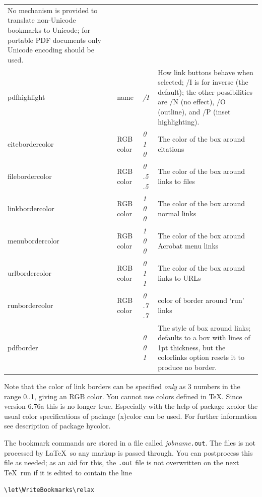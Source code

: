\documentclass[pdftex]{article}
\begin{document}
\begin{longtable}{@{}>{\ttfamily}ll>{\itshape}lp{7.5cm}@{}}
    No mechanism is provided to translate non-Unicode bookmarks to
    Unicode; for portable PDF documents only Unicode encoding should
    be used.\\
pdfhighlight       & name      & /I      & How link buttons behave when selected; /I is for inverse (the default);
                                           the other possibilities are /N (no effect), /O (outline), and /P (inset
                                           highlighting). \\
citebordercolor    & RGB color & 0 1 0   & The color of the box around citations \\
filebordercolor    & RGB color & 0 .5 .5 & The color of the box around links to files \\
linkbordercolor    & RGB color & 1 0 0   & The color of the box around normal links \\
menubordercolor    & RGB color & 1 0 0   & The color of the box around Acrobat menu links \\
urlbordercolor     & RGB color & 0 1 1   & The color of the box around links to URLs \\
runbordercolor     & RGB color & 0 .7 .7 & color of border around `run' links \\
pdfborder          &           & 0 0 1   & The style of box around links; defaults to a box with lines of 1pt thickness,
                                           but the colorlinks option resets it to produce no border.
\end{longtable}

Note that the color of link borders can be specified \emph{only} as 3
numbers in the range 0..1, giving an RGB color. You cannot use colors
defined in \TeX. Since version 6.76a this is no longer true.
Especially with the help of package \textsf{xcolor} the usual
color specifications of package \textsf{(x)color} can be used.
For further information see description of package \textsf{hycolor}.

The bookmark commands are stored in a file called
\textit{jobname}\texttt{.out}. The files is not processed by \LaTeX\ so
any markup is passed through. You can postprocess this file as needed;
as an aid for this, the \texttt{.out} file is not overwritten on the
next \TeX\ run if it is edited to contain the line \\

\begin{verbatim}
\let\WriteBookmarks\relax
\end{verbatim}
\end{document}
